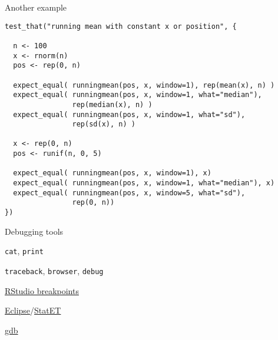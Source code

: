 \documentclass[12pt,t]{beamer}
\begin{document}
\begin{frame}[c,fragile]{Another example}

\begin{lstlisting}
test_that("running mean with constant x or position", {

  n <- 100
  x <- rnorm(n)
  pos <- rep(0, n)

  expect_equal( runningmean(pos, x, window=1), rep(mean(x), n) )
  expect_equal( runningmean(pos, x, window=1, what="median"),
                rep(median(x), n) )
  expect_equal( runningmean(pos, x, window=1, what="sd"),
                rep(sd(x), n) )

  x <- rep(0, n)
  pos <- runif(n, 0, 5)

  expect_equal( runningmean(pos, x, window=1), x)
  expect_equal( runningmean(pos, x, window=1, what="median"), x)
  expect_equal( runningmean(pos, x, window=5, what="sd"),
                rep(0, n))
})
\end{lstlisting}

\end{frame}


\begin{frame}{Debugging tools}


\bbi
\item {\tt cat}, {\tt print}
\item {\tt traceback}, {\tt browser}, {\tt debug}
\item \href{http://www.rstudio.com/ide/docs/debugging/overview}{RStudio breakpoints}
\item \href{http://www.eclipse.org/eclipse}{Eclipse}/\href{http://www.walware.de/goto/statet}{StatET}
\item \href{http://www.sourceware.org/gdb/}{gdb}
\ei

\end{frame}
\end{document}
